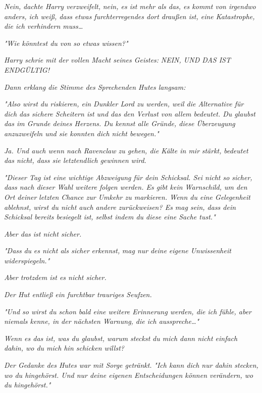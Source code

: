 {\emph{Nein,} \emph{dachte Harry verzweifelt,} \emph{\emph{nein, es ist mehr als das, es kommt von irgendwo anders, ich weiß, dass etwas furchterregendes dort draußen ist, eine Katastrophe, die ich verhindern muss…}}

\emph{"Wie könntest du von so etwas wissen?"}

\emph{Harry schrie mit der vollen Macht seines Geistes:} \emph{\emph{NEIN, UND DAS IST ENDGÜLTIG!}}

\emph{Dann erklang die Stimme des Sprechenden Hutes langsam:}

\emph{\emph{"Also wirst du riskieren, ein Dunkler Lord zu werden, weil die Alternative für dich das sichere Scheitern ist und das den Verlust von allem bedeutet. Du glaubst das im Grunde deines Herzens. Du kennst alle Gründe, diese Überzeugung anzuzweifeln und sie konnten dich nicht bewegen."}}

\emph{Ja. Und auch wenn nach Ravenclaw zu gehen, die Kälte in mir} \emph{stärkt,} \emph{\emph{bedeutet das nicht, dass sie letztendlich}} \emph{gewinnen} \emph{\emph{wird.}}

\emph{"Dieser Tag ist eine wichtige Abzweigung für dein Schicksal. Sei nicht so sicher, dass nach dieser Wahl weitere folgen werden. Es gibt kein Warnschild, um den Ort deiner} \emph{letzten} \emph{\emph{Chance zur Umkehr zu markieren. Wenn du eine Gelegenheit ablehnst, wirst du nicht auch andere zurückweisen? Es mag sein, dass dein Schicksal bereits besiegelt ist, selbst indem du diese eine Sache tust."}}

\emph{Aber das ist nicht sicher.}

\emph{"Dass} \emph{du} \emph{\emph{es nicht als sicher}} \emph{erkennst,} \emph{\emph{mag nur}} \emph{deine} \emph{\emph{eigene Unwissenheit widerspiegeln."}}

\emph{Aber trotzdem ist es nicht sicher.}

\emph{Der Hut entließ ein furchtbar trauriges Seufzen.}

\emph{\emph{"Und so wirst du schon bald eine weitere Erinnerung werden, die ich fühle, aber niemals kenne, in der nächsten Warnung, die ich ausspreche…"}}

\emph{Wenn es das ist, was du glaubst, warum} \emph{steckst} \emph{\emph{du mich dann nicht einfach dahin, wo du mich hin schicken willst?}}

\emph{Der Gedanke des Hutes war mit Sorge getränkt.} \emph{\emph{"Ich kann dich nur dahin stecken, wo du hingehörst. Und nur deine eigenen Entscheidungen können verändern, wo du hingehörst."}}

}

